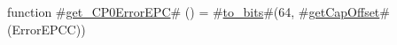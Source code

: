 function #\hyperref[sailMIPSzgetzyCP0ErrorEPC]{get\_CP0ErrorEPC}# () =
  #\hyperref[sailMIPSztozybits]{to\_bits}#(64, #\hyperref[sailMIPSzgetCapOffset]{getCapOffset}#(ErrorEPCC))
